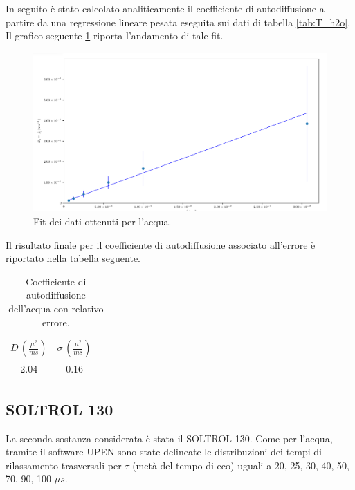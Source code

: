 In seguito è stato calcolato analiticamente il coefficiente di autodiffusione a partire da una regressione lineare pesata eseguita sui dati di tabella \ref{tab:T_h2o}.
Il grafico seguente \ref{fig:Df_h2o} riporta l'andamento di tale fit.

\begin{figure}[h!]
\centering
\includegraphics[scale=0.3]{Figure/H2O_calc.png}
\caption{Fit dei dati ottenuti per l'acqua.}
\label{fig:Df_h2o}
\end{figure}

Il risultato finale per il coefficiente di autodiffusione associato all'errore è riportato nella tabella seguente.

\begin{table}[h!]
    \begin{center}
    \begin{tabular}{c c c}
    \toprule
    	$D\,(\frac{{\mu}^2}{ms})$ & $\sigma\,(\frac{{\mu}^2}{ms})$ \\
    \midrule
    	2.04	&	0.16	\\
    \bottomrule
    \end{tabular}
    \caption{Coefficiente di autodiffusione dell'acqua con relativo errore.}
    \label{tab:Df_h2o}
    \end{center}
\end{table}


\subsection*{SOLTROL 130}

La seconda sostanza considerata è stata il SOLTROL 130.
Come per l'acqua, tramite il software UPEN sono state delineate le distribuzioni dei tempi di rilassamento trasversali per $\tau$ (metà del tempo di eco) uguali a 20, 25, 30, 40, 50, 70, 90, 100 ${\mu}s$.

